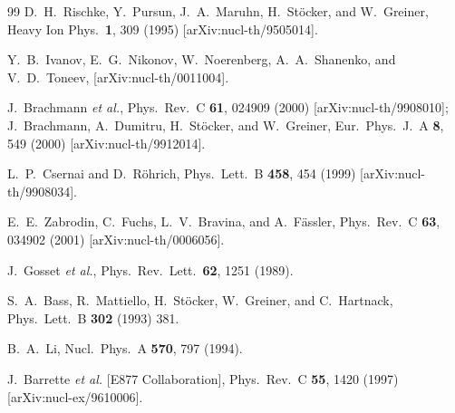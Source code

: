 \documentclass[aps,prc,superscriptaddress,showpacs,floatfix,nofootinbib]{revtex4}
\begin{document}
\begin{thebibliography}{99}
D.~H.~Rischke, Y.~Pursun, J.~A.~Maruhn, H.~St\"ocker, and W.~Greiner,
Heavy Ion Phys.\  {\bf 1}, 309 (1995)
[arXiv:nucl-th/9505014].

Y.~B.~Ivanov, E.~G.~Nikonov, W.~Noerenberg, A.~A.~Shanenko, and V.~D.~Toneev,
[arXiv:nucl-th/0011004].

J.~Brachmann {\it et al.},
Phys.\ Rev.\ C {\bf 61}, 024909 (2000)
[arXiv:nucl-th/9908010];
J.~Brachmann, A.~Dumitru, H.~St\"ocker, and W.~Greiner,
Eur.\ Phys.\ J.\ A {\bf 8}, 549 (2000)
[arXiv:nucl-th/9912014].

L.~P.~Csernai and D.~R\"ohrich,
Phys.\ Lett.\ B {\bf 458}, 454 (1999)
[arXiv:nucl-th/9908034].

E.~E.~Zabrodin, C.~Fuchs, L.~V.~Bravina, and A.~F\"assler,
Phys.\ Rev.\ C {\bf 63}, 034902 (2001)
[arXiv:nucl-th/0006056].


J.~Gosset {\it et al.},
Phys.\ Rev.\ Lett.\  {\bf 62}, 1251 (1989).

S.~A.~Bass, R.~Mattiello, H.~St{\"o}cker, W.~Greiner, and C.~Hartnack,
Phys.\ Lett.\ B {\bf 302} (1993) 381.

B.~A.~Li,
Nucl.\ Phys.\ A {\bf 570}, 797 (1994).

J.~Barrette {\it et al.}  [E877 Collaboration],
Phys.\ Rev.\ C {\bf 55}, 1420 (1997)
[arXiv:nucl-ex/9610006].

\end{thebibliography}
\end{document}
